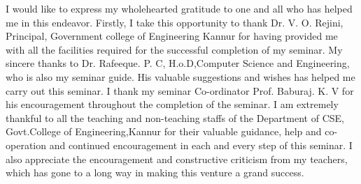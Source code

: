 I would like to express my wholehearted gratitude to one and all who has
helped me in this endeavor. Firstly, I take this opportunity to thank Dr. V.
O. Rejini, Principal, Government college of Engineering Kannur for having
provided me with all the facilities required for the successful completion of my
seminar. My sincere thanks to Dr. Rafeeque. P. C, H.o.D,Computer Science
and Engineering, who is also my seminar guide. His valuable suggestions and wishes has helped me carry out this seminar. I
thank my seminar Co-ordinator Prof. Baburaj. K. V for his encouragement
throughout the completion of the seminar. I am extremely thankful to all the
teaching and non-teaching staffs of the Department of CSE, Govt.College of
Engineering,Kannur for their valuable guidance, help and co-operation and
continued encouragement in each and every step of this seminar. I also appreciate the encouragement and constructive criticism from my teachers, which
has gone to a long way in making this venture a grand success.
